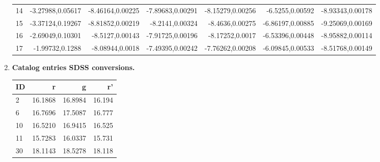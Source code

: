 \documentclass{article}
\begin{document}
\begin{enumerate}
\begin{table}
\begin{tabular} {l r r r r r r}
				14 & -3.27988,0.05617 & -8.46164,0.00225 & -7.89683,0.00291 & -8.15279,0.00256 & -6.5255,0.00592 & -8.93343,0.00178 \\
				15 & -3.37124,0.19267 & -8.81852,0.00219 & -8.2141,0.00324 & -8.4636,0.00275 & -6.86197,0.00885 & -9.25069,0.00169 \\
				16 & -2.69049,0.10301 & -8.5127,0.00143 & -7.91725,0.00196 & -8.17252,0.0017 & -6.53396,0.00448 & -8.95882,0.00114 \\
				17 & -1.99732,0.1288 & -8.08944,0.0018 & -7.49395,0.00242 & -7.76262,0.00208 & -6.09845,0.00533 & -8.51768,0.00149 \\
				\bottomrule
			\end{tabular}
		\end{table}
	
		\item \textbf{Catalog entries SDSS conversions.}
		\begin{table} [h]
			\centering
			\begin{tabular} {l r r r}
				\toprule
				\textbf{ID} & \textbf{r} & \textbf{g} & \textbf{r'} \\
				\midrule
				2 & 16.1868 & 16.8984 & 16.194 \\
				6 & 16.7696 & 17.5087 & 16.777 \\
				10 & 16.5210 & 16.9415 & 16.525 \\
				11 & 15.7283 & 16.0337 & 15.731 \\
				30 & 18.1143 & 18.5278 & 18.118\\
			\end{tabular}
		\end{table}
	\end{enumerate}
\end{document}
